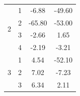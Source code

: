 \begin{table}[H]
\begin{tabular}{|c|c|c|c|}
  \multirow{4}{*}{2}                                                           & 1                                                                            & -6.88                                                                                                 & -49.60                                                                                                \\ \cline{2-4} 
                                                                              & 2                                                                            & -65.80                                                                                                & -53.00                                                                                                \\ \cline{2-4} 
                                                                              & 3                                                                            & -2.66                                                                                                 & 1.65                                                                                                  \\ \cline{2-4} 
                                                                              & 4                                                                            & -2.19                                                                                                 & -3.21                                                                                                 \\ \hline
  \multirow{4}{*}{3}                                                           & 1                                                                            & 4.54                                                                                                  & -52.10                                                                                                \\ \cline{2-4} 
                                                                              & 2                                                                            & 7.02                                                                                                  & -7.23                                                                                                 \\ \cline{2-4} 
                                                                              & 3                                                                            & 6.34                                                                                                  & 2.11                                                                                                  \\ \cline{2-4} 

\end{tabular}
\end{table}
